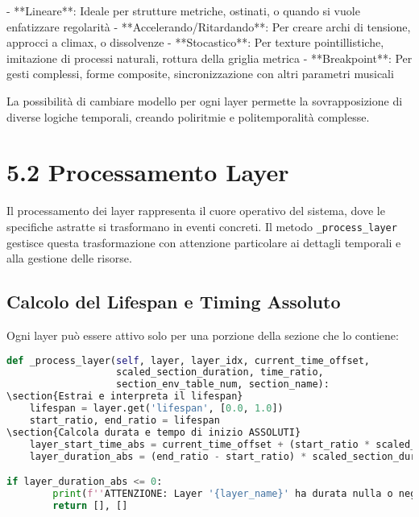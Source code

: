 - **Lineare**: Ideale per strutture metriche, ostinati, o quando si vuole enfatizzare regolarità
- **Accelerando/Ritardando**: Per creare archi di tensione, approcci a climax, o dissolvenze
- **Stocastico**: Per texture pointillistiche, imitazione di processi naturali, rottura della griglia metrica
- **Breakpoint**: Per gesti complessi, forme composite, sincronizzazione con altri parametri musicali

La possibilità di cambiare modello per ogni layer permette la sovrapposizione di diverse logiche temporali, creando poliritmie e politemporalità complesse.
\section{5.2 Processamento Layer}
Il processamento dei layer rappresenta il cuore operativo del sistema, dove le specifiche astratte si trasformano in eventi concreti. Il metodo \texttt{\_process\_layer} gestisce questa trasformazione con attenzione particolare ai dettagli temporali e alla gestione delle risorse.
\subsection{Calcolo del Lifespan e Timing Assoluto}
Ogni layer può essere attivo solo per una porzione della sezione che lo contiene:

\begin{lstlisting}[language=Python]
def _process_layer(self, layer, layer_idx, current_time_offset, 
                   scaled_section_duration, time_ratio, 
                   section_env_table_num, section_name):
\section{Estrai e interpreta il lifespan}
    lifespan = layer.get('lifespan', [0.0, 1.0])
    start_ratio, end_ratio = lifespan
\section{Calcola durata e tempo di inizio ASSOLUTI}
    layer_start_time_abs = current_time_offset + (start_ratio * scaled_section_duration)
    layer_duration_abs = (end_ratio - start_ratio) * scaled_section_duration

if layer_duration_abs <= 0:
        print(f''ATTENZIONE: Layer '{layer_name}' ha durata nulla o negativa.'')
        return [], []
\end{lstlisting}

